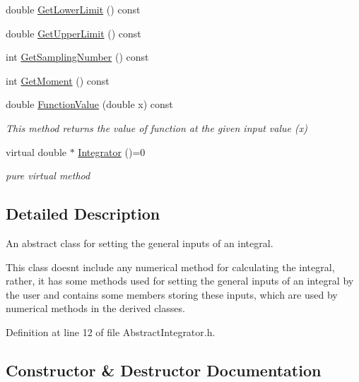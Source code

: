 \begin{DoxyCompactItemize}
double \hyperlink{class_abstract_integrator_ae27a09d1e3fb0a30ce9545a4d8f29cad}{Get\+Lower\+Limit} () const
\item 
double \hyperlink{class_abstract_integrator_a864fe7dc9aa1ff0b36da0b8f361a5b69}{Get\+Upper\+Limit} () const
\item 
int \hyperlink{class_abstract_integrator_ac58629ec6822b3beeefdd1323b627704}{Get\+Sampling\+Number} () const
\item 
int \hyperlink{class_abstract_integrator_a7f709ab302dfe70b5f0f2ce80456fcdb}{Get\+Moment} () const
\item 
double \hyperlink{class_abstract_integrator_a6262731b81f3ad7e984ba354b4601356}{Function\+Value} (double x) const
\begin{DoxyCompactList}\small\item\em This method returns the value of function at the given input value (x) \end{DoxyCompactList}\item 
virtual double $\ast$ \hyperlink{class_abstract_integrator_a073d8f87239f732b3d2832070caa3b17}{Integrator} ()=0
\begin{DoxyCompactList}\small\item\em pure virtual method \end{DoxyCompactList}\end{DoxyCompactItemize}


\subsection{Detailed Description}
An abstract class for setting the general inputs of an integral. 

This class doesn\textquotesingle{}t include any numerical method for calculating the integral, rather, it has some methods used for setting the general inputs of an integral by the user and contains some members storing these inputs, which are used by numerical methods in the derived classes. 

Definition at line 12 of file Abstract\+Integrator.\+h.



\subsection{Constructor \& Destructor Documentation}
\mbox{\label{class_abstract_integrator_aa88168bae2057a179c9ecc2ba9639f61}} 
